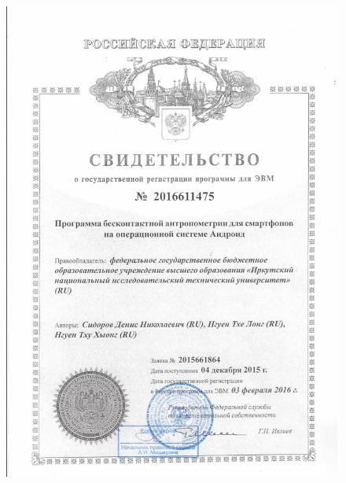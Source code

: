\begin{figure}[ht!]
\centering
\includegraphics [width=0.9\linewidth] {images/p31.png}\label{imgp31}
\end{figure}
